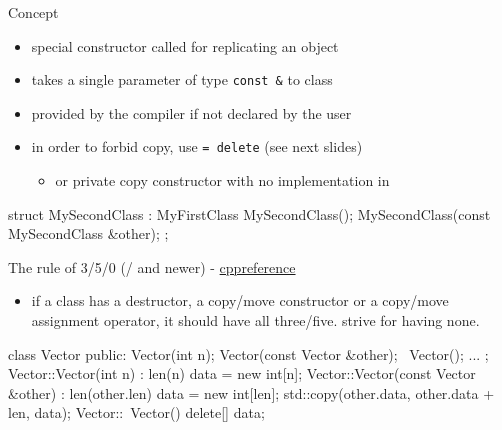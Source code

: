\begin{frame}[fragile]
  \begin{block}{Concept}
    \begin{itemize}
    \item special constructor called for replicating an object
    \item takes a single parameter of type \texttt{const &} to class
    \item provided by the compiler if not declared by the user
    \item in order to forbid copy, use \texttt{= delete} (see next slides)
      \begin{itemize}
      \item or private copy constructor with no implementation in 
      \end{itemize}
    \end{itemize}
  \end{block}
  \pause
  \begin{cppcode}
    struct MySecondClass : MyFirstClass {
      MySecondClass();
      MySecondClass(const MySecondClass &other);
    };
  \end{cppcode}
  \pause
  \begin{exampleblock}{The rule of 3/5/0 (/ and newer) - {\color{blue!50!white} \href{https://en.cppreference.com/w/cpp/language/rule_of_three}{cppreference}}}
    \begin{itemize}
    \item if a class has a destructor, a copy/move constructor or a copy/move assignment operator, it should have all three/five. strive for having none.
    \end{itemize}
  \end{exampleblock}
\end{frame}

\begin{frame}[fragile]
  \begin{cppcode}
    class Vector {
    public:
      Vector(int n);
      Vector(const Vector &other);
      ~Vector();
      ...
    };
    Vector::Vector(int n) : len(n) {
      data = new int[n];
    }
    Vector::Vector(const Vector &other) : len(other.len) {
      data = new int[len];
      std::copy(other.data, other.data + len, data);
    }
    Vector::~Vector() { delete[] data; }
  \end{cppcode}
\end{frame}


